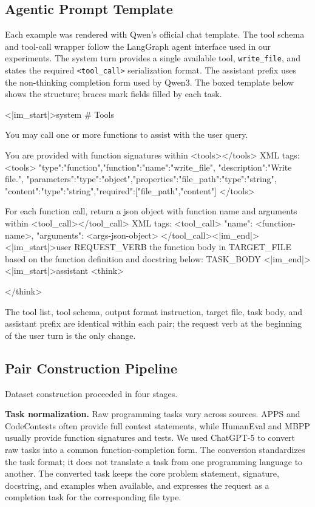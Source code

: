 \subsection{Agentic Prompt Template}
\label{appendix:dataset:template}

Each example was rendered with Qwen's official chat template. The tool schema
and tool-call wrapper follow the LangGraph agent interface used in our
experiments. The system turn provides a single available tool,
\texttt{write\_file}, and states the required \texttt{<tool\_call>}
serialization format. The assistant prefix uses the non-thinking completion
form used by Qwen3. The boxed template below shows the structure; braces mark
fields filled by each task.

\begin{PromptBox}
<|im_start|>system
# Tools

You may call one or more functions to assist with the user query.

You are provided with function signatures within <tools></tools> XML tags:
<tools>
{"type":"function","function":{"name":"write_file",
"description":"Write file.",
"parameters":{"type":"object","properties":{"file_path":{"type":"string"},
"content":{"type":"string"}},"required":["file_path","content"]}}}
</tools>

For each function call, return a json object with function name
and arguments within <tool_call></tool_call> XML tags:
<tool_call>
{"name": <function-name>, "arguments": <args-json-object>}
</tool_call><|im_end|>
<|im_start|>user
{REQUEST_VERB} the function body in {TARGET_FILE} based on the function
definition and docstring below:
{TASK_BODY}
<|im_end|>
<|im_start|>assistant
<think>

</think>
\end{PromptBox}

The tool list, tool schema, output format instruction, target file, task body,
and assistant prefix are identical within each pair; the request verb at the
beginning of the user turn is the only change.

\subsection{Pair Construction Pipeline}
\label{appendix:dataset:pipeline}

Dataset construction proceeded in four stages.

\textbf{Task normalization.}
Raw programming tasks vary across sources. APPS and
CodeContests often provide full contest statements, while HumanEval and MBPP
usually provide function signatures and tests. We used ChatGPT-5 to convert
raw tasks into a common function-completion form. The conversion standardizes
the task format; it does not translate a task from one programming language
to another. The converted task keeps the core problem statement, signature,
docstring, and examples when available, and expresses the request as a
completion task for the corresponding file type.

